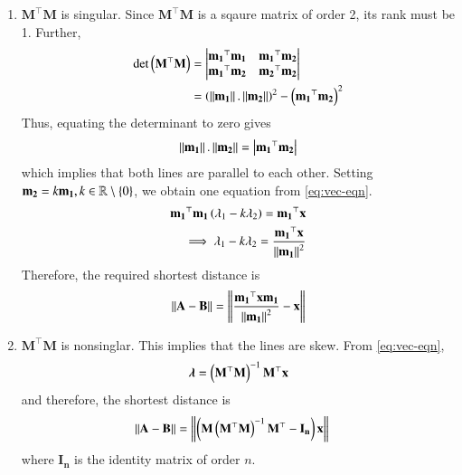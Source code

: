 \documentclass[journal,12pt,twocolumn]{IEEEtran}
\renewcommand{\vec}[1]{\boldsymbol{\mathbf{#1}}}
\begin{document}
\begin{enumerate}
\begin{enumerate}
        \item $\vec{M}^\top\vec{M}$ is singular. Since $\vec{M}^\top\vec{M}$ is a 
        sqaure matrix of order 2, its rank must be 1. Further,
        \begin{align}
            \det\brak{\vec{M}^\top\vec{M}} &= \mydet{\vec{m_1}^\top\vec{m_1} & \vec{m_1}^\top\vec{m_2} \\
                                                \vec{m_1}^\top\vec{m_2} & \vec{m_2}^\top\vec{m_2}} \\
                                      &= \brak{\norm{\vec{m_1}}.\norm{\vec{m_2}}}^2 - \brak{\vec{m_1}^\top\vec{m_2}}^2
                                      \label{eq:det-parallel}
        \end{align}
        Thus, equating the determinant to zero gives
        \begin{align}
            \norm{\vec{m_1}}.\norm{\vec{m_2}} = \abs{\vec{m_1}^\top\vec{m_2}}
            \label{eq:vec-parallel}
        \end{align}
        which implies that both lines are parallel to each other. Setting 
        $\vec{m_2} = k\vec{m_1}, k\in\mathbb{R}\setminus\cbrak{0}$, we obtain one
        equation from \eqref{eq:vec-eqn}.
        \begin{align}
            \vec{m_1}^\top\vec{m_1}\brak{\lambda_1-k\lambda_2} = \vec{m_1}^\top\vec{x} \\
            \implies \lambda_1-k\lambda_2 = \frac{\vec{m_1}^\top\vec{x}}{\norm{\vec{m_1}}^2}
            \label{eq:lambda-expr}
        \end{align}
        Therefore, the required shortest distance is
        \begin{align}
            \norm{\vec{A}-\vec{B}} = \norm{\frac{\vec{m_1}^\top\vec{x}\vec{m_1}}{\norm{\vec{m_1}}^2}-\vec{x}}
            \label{eq:dist-parallel}
        \end{align}

        \item $\vec{M}^\top\vec{M}$ is nonsinglar. This implies that the lines
        are skew. From \eqref{eq:vec-eqn},
        \begin{align}
            \vec{\lambda} = \brak{\vec{M}^\top\vec{M}}^{-1}\vec{M}^\top\vec{x}
            \label{eq:lambda-skew}
        \end{align}
        and therefore, the shortest distance is
        \begin{align}
            \norm{\vec{A}-\vec{B}} &= \norm{\brak{\vec{M}\brak{\vec{M}^\top\vec{M}}^{-1}\vec{M}^\top - \vec{I_n}}\vec{x}} 
            \label{eq:dist-skew}
        \end{align}
        where $\vec{I_n}$ is the identity matrix of order $n$.
    \end{enumerate}
\end{enumerate}
\end{document}
